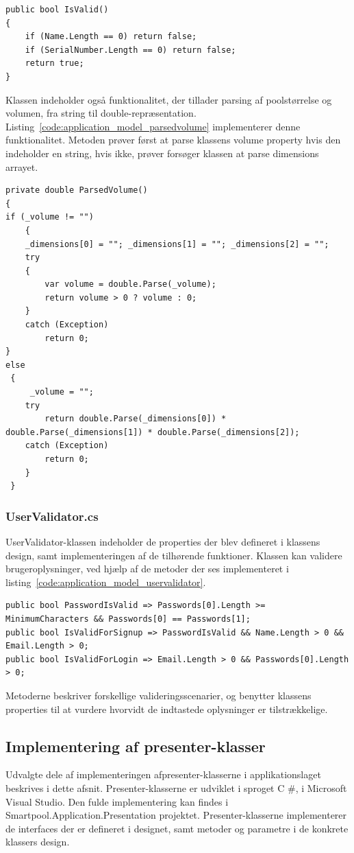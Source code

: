\begin{lstlisting}[caption={IsValid()},label={code:application_model_pvisvalid}]
public bool IsValid()
{
	if (Name.Length == 0) return false;
	if (SerialNumber.Length == 0) return false;
	return true;
}
\end{lstlisting}

Klassen indeholder også funktionalitet, der tillader parsing af poolstørrelse og volumen, fra string til double-repræsentation. Listing~\ref{code:application_model_parsedvolume} implementerer denne funktionalitet. Metoden prøver først at parse klassens volume property hvis den indeholder en string, hvis ikke, prøver forsøger klassen at parse dimensions arrayet.

\begin{lstlisting}[caption={ParsedVolume()},label={code:application_model_parsedvolume}]
private double ParsedVolume()
{
if (_volume != "")
	{
	_dimensions[0] = ""; _dimensions[1] = ""; _dimensions[2] = "";
	try
	{
		var volume = double.Parse(_volume);
		return volume > 0 ? volume : 0;
	}
	catch (Exception)
		return 0;
}
else
 {
	 _volume = "";
	try
		return double.Parse(_dimensions[0]) * double.Parse(_dimensions[1]) * double.Parse(_dimensions[2]);
	catch (Exception)
		return 0;
	}
 }
\end{lstlisting}

\subsubsection{UserValidator.cs}
UserValidator-klassen indeholder de properties der blev defineret i klassens design, samt implementeringen af de tilhørende funktioner. Klassen kan validere brugeroplysninger, ved hjælp af de metoder der ses implementeret i listing~\ref{code:application_model_uservalidator}.

\begin{lstlisting}[caption={UserValidator valideringsmetoder},label={code:application_model_uservalidator}]
public bool PasswordIsValid => Passwords[0].Length >= MinimumCharacters && Passwords[0] == Passwords[1];
public bool IsValidForSignup => PasswordIsValid && Name.Length > 0 && Email.Length > 0;
public bool IsValidForLogin => Email.Length > 0 && Passwords[0].Length > 0;
\end{lstlisting}

Metoderne beskriver forskellige valideringsscenarier, og benytter klassens properties til at vurdere hvorvidt de indtastede oplysninger er tilstrækkelige.

\subsection{Implementering af presenter-klasser}
Udvalgte dele af implementeringen afpresenter-klasserne i applikationslaget beskrives i dette afsnit. Presenter-klasserne er udviklet i sproget C \#, i Microsoft Visual Studio. Den fulde implementering kan findes i Smartpool.Application.Presentation projektet. Presenter-klasserne implementerer de interfaces der er defineret i designet, samt metoder og parametre i de konkrete klassers design.

